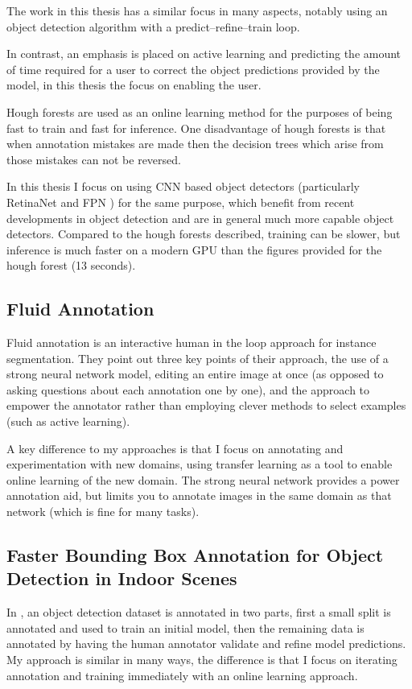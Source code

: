 The work in this thesis has a similar focus in many aspects, notably using an object detection algorithm with a predict--refine--train loop. 

In contrast, an emphasis is placed on active learning and predicting the amount of time required for a user to correct the object predictions provided by the model, in this thesis the focus on enabling the user. 

Hough forests \cite{Gall2011} are used as an online learning method for the purposes of being fast to train and fast for inference. One disadvantage of hough forests is that when annotation mistakes are made then the decision trees which arise from those mistakes can not be reversed. 

In this thesis I focus on using \gls{CNN} based object detectors (particularly RetinaNet \cite{Lin2017} and \gls{FPN} \cite{Lin2017a}) for the same purpose, which benefit from recent developments in object detection and are in general much more capable object detectors. Compared to the hough forests described, training can be slower, but inference is much faster on a modern \gls{GPU} than the figures provided for the hough forest (13 seconds).



\subsection{Fluid Annotation \cite{Andriluka2018}}
Fluid annotation is an interactive human in the loop approach for instance segmentation. They point out three key points of their approach, the use of a strong neural network model, editing an entire image at once (as opposed to asking questions about each annotation one by one), and the approach to empower the annotator rather than employing clever methods to select examples (such as active learning).

A key difference to my approaches is that I focus on annotating and experimentation with new domains, using transfer learning as a tool to enable online learning of the new domain. The strong neural network provides a power annotation aid, but limits you to annotate images in the same domain as that network (which is fine for many tasks).

\subsection{Faster Bounding Box Annotation for Object Detection in Indoor Scenes}
In \cite{Adhikaria2018}, an object detection dataset is annotated in two parts, first a small split is annotated and used to train an initial model, then the remaining data is annotated by having the human annotator validate and refine model predictions. My approach is similar in many ways, the difference is that I focus on iterating annotation and training immediately with an online learning approach.

